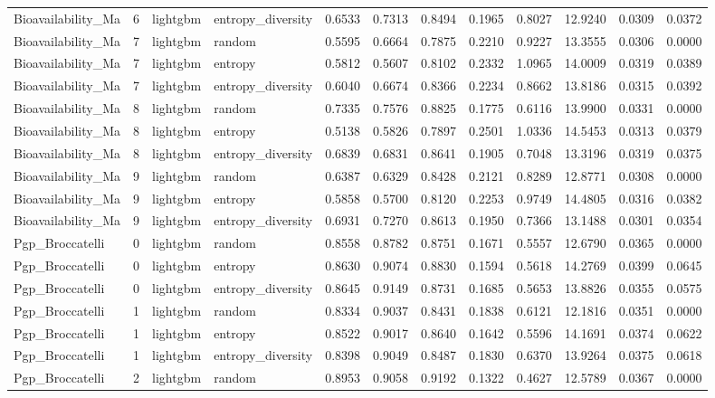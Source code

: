 \begin{tabular}{lrllrrrrrrrr}
Bioavailability_Ma & 6 & lightgbm & entropy_diversity & 0.6533 & 0.7313 & 0.8494 & 0.1965 & 0.8027 & 12.9240 & 0.0309 & 0.0372 \\
Bioavailability_Ma & 7 & lightgbm & random & 0.5595 & 0.6664 & 0.7875 & 0.2210 & 0.9227 & 13.3555 & 0.0306 & 0.0000 \\
Bioavailability_Ma & 7 & lightgbm & entropy & 0.5812 & 0.5607 & 0.8102 & 0.2332 & 1.0965 & 14.0009 & 0.0319 & 0.0389 \\
Bioavailability_Ma & 7 & lightgbm & entropy_diversity & 0.6040 & 0.6674 & 0.8366 & 0.2234 & 0.8662 & 13.8186 & 0.0315 & 0.0392 \\
Bioavailability_Ma & 8 & lightgbm & random & 0.7335 & 0.7576 & 0.8825 & 0.1775 & 0.6116 & 13.9900 & 0.0331 & 0.0000 \\
Bioavailability_Ma & 8 & lightgbm & entropy & 0.5138 & 0.5826 & 0.7897 & 0.2501 & 1.0336 & 14.5453 & 0.0313 & 0.0379 \\
Bioavailability_Ma & 8 & lightgbm & entropy_diversity & 0.6839 & 0.6831 & 0.8641 & 0.1905 & 0.7048 & 13.3196 & 0.0319 & 0.0375 \\
Bioavailability_Ma & 9 & lightgbm & random & 0.6387 & 0.6329 & 0.8428 & 0.2121 & 0.8289 & 12.8771 & 0.0308 & 0.0000 \\
Bioavailability_Ma & 9 & lightgbm & entropy & 0.5858 & 0.5700 & 0.8120 & 0.2253 & 0.9749 & 14.4805 & 0.0316 & 0.0382 \\
Bioavailability_Ma & 9 & lightgbm & entropy_diversity & 0.6931 & 0.7270 & 0.8613 & 0.1950 & 0.7366 & 13.1488 & 0.0301 & 0.0354 \\
Pgp_Broccatelli & 0 & lightgbm & random & 0.8558 & 0.8782 & 0.8751 & 0.1671 & 0.5557 & 12.6790 & 0.0365 & 0.0000 \\
Pgp_Broccatelli & 0 & lightgbm & entropy & 0.8630 & 0.9074 & 0.8830 & 0.1594 & 0.5618 & 14.2769 & 0.0399 & 0.0645 \\
Pgp_Broccatelli & 0 & lightgbm & entropy_diversity & 0.8645 & 0.9149 & 0.8731 & 0.1685 & 0.5653 & 13.8826 & 0.0355 & 0.0575 \\
Pgp_Broccatelli & 1 & lightgbm & random & 0.8334 & 0.9037 & 0.8431 & 0.1838 & 0.6121 & 12.1816 & 0.0351 & 0.0000 \\
Pgp_Broccatelli & 1 & lightgbm & entropy & 0.8522 & 0.9017 & 0.8640 & 0.1642 & 0.5596 & 14.1691 & 0.0374 & 0.0622 \\
Pgp_Broccatelli & 1 & lightgbm & entropy_diversity & 0.8398 & 0.9049 & 0.8487 & 0.1830 & 0.6370 & 13.9264 & 0.0375 & 0.0618 \\
Pgp_Broccatelli & 2 & lightgbm & random & 0.8953 & 0.9058 & 0.9192 & 0.1322 & 0.4627 & 12.5789 & 0.0367 & 0.0000 \\

\end{tabular}
